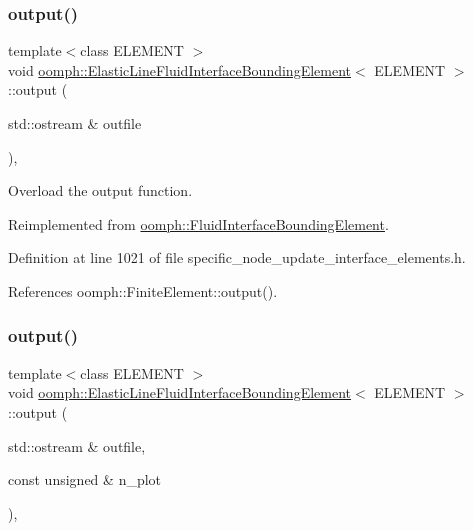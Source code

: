 \subsubsection{\texorpdfstring{output()}{output()}\hspace{0.1cm}{\footnotesize\ttfamily [1/4]}}
{\footnotesize\ttfamily template$<$class E\+L\+E\+M\+E\+NT $>$ \\
void \hyperlink{classoomph_1_1ElasticLineFluidInterfaceBoundingElement}{oomph\+::\+Elastic\+Line\+Fluid\+Interface\+Bounding\+Element}$<$ E\+L\+E\+M\+E\+NT $>$\+::output (\begin{DoxyParamCaption}\item[{std\+::ostream \&}]{outfile }\end{DoxyParamCaption})\hspace{0.3cm}{\ttfamily [inline]}, {\ttfamily [virtual]}}



Overload the output function. 



Reimplemented from \hyperlink{classoomph_1_1FluidInterfaceBoundingElement_a81adc5ae89ddfa120f587c61b972622f}{oomph\+::\+Fluid\+Interface\+Bounding\+Element}.



Definition at line 1021 of file specific\+\_\+node\+\_\+update\+\_\+interface\+\_\+elements.\+h.



References oomph\+::\+Finite\+Element\+::output().

\mbox{\label{classoomph_1_1ElasticLineFluidInterfaceBoundingElement_a7a0df1419f28df0351ed1c5e05f8f751}} 
\subsubsection{\texorpdfstring{output()}{output()}\hspace{0.1cm}{\footnotesize\ttfamily [2/4]}}
{\footnotesize\ttfamily template$<$class E\+L\+E\+M\+E\+NT $>$ \\
void \hyperlink{classoomph_1_1ElasticLineFluidInterfaceBoundingElement}{oomph\+::\+Elastic\+Line\+Fluid\+Interface\+Bounding\+Element}$<$ E\+L\+E\+M\+E\+NT $>$\+::output (\begin{DoxyParamCaption}\item[{std\+::ostream \&}]{outfile,  }\item[{const unsigned \&}]{n\+\_\+plot }\end{DoxyParamCaption})\hspace{0.3cm}{\ttfamily [inline]}, {\ttfamily [virtual]}}



